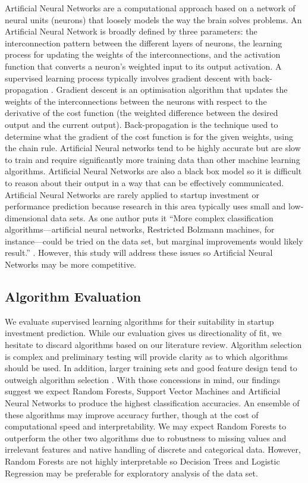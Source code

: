\documentclass[../thesis/thesis.tex]{subfiles}
\begin{document}
\begin{refsection}
Artificial Neural Networks are a computational approach based on a network of neural units (neurons) that loosely models the way the brain solves problems. An Artificial Neural Network is broadly defined by three parameters: the interconnection pattern between the different layers of neurons, the learning process for updating the weights of the interconnections, and the activation function that converts a neuron's weighted input to its output activation. A supervised learning process typically involves gradient descent with back-propagation \cite{rumelhart1988}. Gradient descent is an optimisation algorithm that updates the weights of the interconnections between the neurons with respect to the derivative of the cost function (the weighted difference between the desired output and the current output). Back-propagation is the technique used to determine what the gradient of the cost function is for the given weights, using the chain rule. Artificial Neural networks tend to be highly accurate but are slow to train and require significantly more training data than other machine learning algorithms. Artificial Neural Networks are also a black box model so it is difficult to reason about their output in a way that can be effectively communicated. Artificial Neural Networks are rarely applied to startup investment or performance prediction because research in this area typically uses small and low-dimensional data sets. As one author puts it ``More complex classification algorithms—artificial neural networks, Restricted Bolzmann machines, for instance—could be tried on the data set, but marginal improvements would likely result.'' \cite{beckwith2016}. However, this study will address these issues so Artificial Neural Networks may be more competitive.

\subsection{Algorithm Evaluation}

We evaluate supervised learning algorithms for their suitability in startup investment prediction. While our evaluation gives us directionality of fit, we hesitate to discard algorithms based on our literature review. Algorithm selection is complex and preliminary testing will provide clarity as to which algorithms should be used. In addition, larger training sets and good feature design tend to outweigh algorithm selection \cite{caruana2008}. With those concessions in mind, our findings suggest we expect Random Forests, Support Vector Machines and Artificial Neural Networks to produce the highest classification accuracies. An ensemble of these algorithms may improve accuracy further, though at the cost of computational speed and interpretability. We may expect Random Forests to outperform the other two algorithms due to robustness to missing values and irrelevant features and native handling of discrete and categorical data. However, Random Forests are not highly interpretable so Decision Trees and Logistic Regression may be preferable for exploratory analysis of the data set.


\end{refsection}
\end{document}

